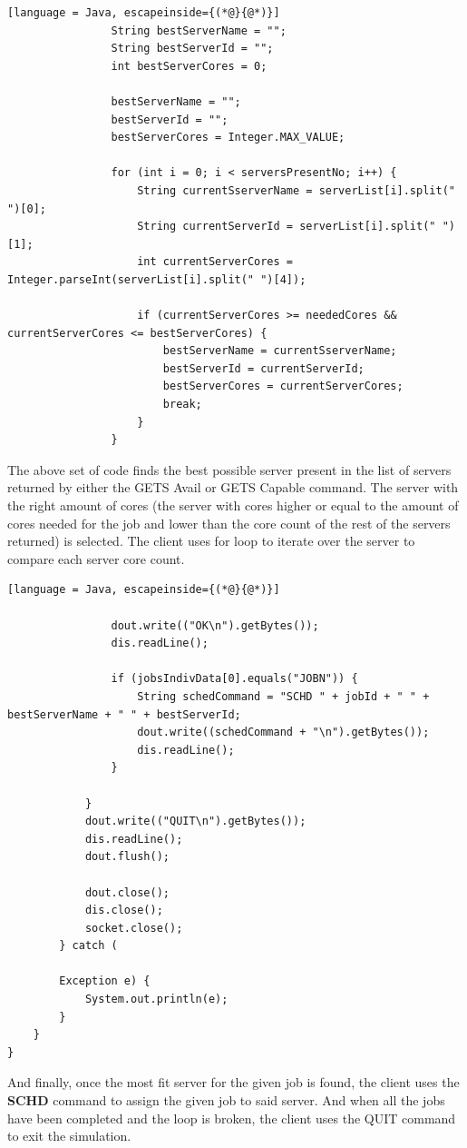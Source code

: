 \documentclass[a4paper]{article} %
\begin{document}
\begin{lstlisting}[language = Java, escapeinside={(*@}{@*)}]
				String bestServerName = "";
				String bestServerId = "";
				int bestServerCores = 0;

				bestServerName = "";
				bestServerId = "";
				bestServerCores = Integer.MAX_VALUE;

				for (int i = 0; i < serversPresentNo; i++) {
					String currentSserverName = serverList[i].split(" ")[0];
					String currentServerId = serverList[i].split(" ")[1];
					int currentServerCores = Integer.parseInt(serverList[i].split(" ")[4]);

					if (currentServerCores >= neededCores && currentServerCores <= bestServerCores) {
						bestServerName = currentSserverName;
						bestServerId = currentServerId;
						bestServerCores = currentServerCores;
						break;
					}
				}
\end{lstlisting}
The above set of code finds the best possible server present in the list of servers returned by either the GETS Avail or 
GETS Capable command. The server with the right amount of cores (the server with cores higher or equal to the amount of cores
needed for the job and lower than the core count of the rest of the servers returned) is selected. The client uses for loop to 
iterate over the server to compare each server core count. \\

\begin{lstlisting}[language = Java, escapeinside={(*@}{@*)}]

				dout.write(("OK\n").getBytes());
				dis.readLine();

				if (jobsIndivData[0].equals("JOBN")) {
					String schedCommand = "SCHD " + jobId + " " + bestServerName + " " + bestServerId;
					dout.write((schedCommand + "\n").getBytes());
					dis.readLine();
				}

			}
			dout.write(("QUIT\n").getBytes());
			dis.readLine();
			dout.flush();

			dout.close();
			dis.close();
			socket.close();
		} catch (

		Exception e) {
			System.out.println(e);
		}
	}
}
\end{lstlisting}

And finally, once the most fit server for the given job is found, the client uses the \textbf{SCHD} command to assign the 
given job to said server. And when all the jobs have been completed and the loop is broken, the client uses the 
QUIT command to exit the simulation. 
\end{document}

